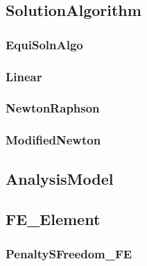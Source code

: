 \documentclass[12pt]{article}
\begin{document}
\pagebreak \subsection{{\bf SolutionAlgorithm}}


\pagebreak \subsubsection{{\bf EquiSolnAlgo}}


\pagebreak \subsubsection{Linear}


\pagebreak \subsubsection{NewtonRaphson}


\pagebreak \subsubsection{ModifiedNewton}


%

\pagebreak \subsection{AnalysisModel}


\pagebreak \subsection{FE\_Element}


\pagebreak \subsubsection{PenaltySFreedom\_FE}

\end{document}
